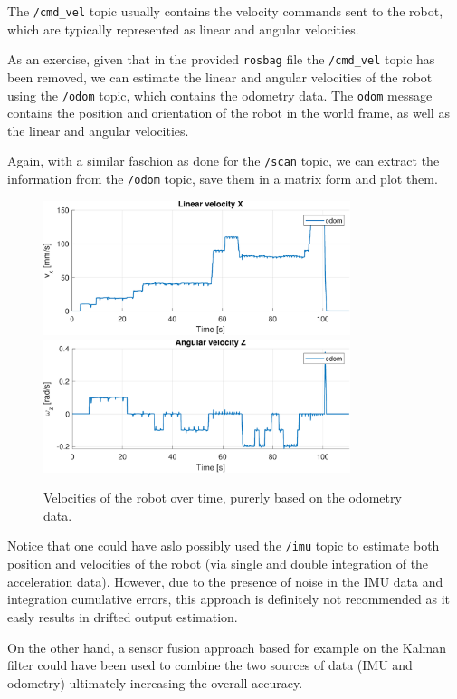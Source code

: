 The \texttt{/cmd\_vel} topic usually contains the velocity commands sent to the robot, which are typically represented as linear and angular velocities.

As an exercise, given that in the provided \texttt{rosbag} file the \texttt{/cmd\_vel} topic has been removed, we can estimate the linear and angular velocities of the robot using the \texttt{/odom} topic, which contains the odometry data.
The \texttt{odom} message contains the position and orientation of the robot in the world frame, as well as the linear and angular velocities.

Again, with a similar faschion as done for the \texttt{/scan} topic, we can extract the information from the \texttt{/odom} topic, save them in a matrix form and plot them.

\begin{figure}[H]
    \centering
    \includegraphics[width=0.8\textwidth]{./img/MATLAB/linear_velocity.pdf}
    \vspace{9pt}
    \includegraphics[width=0.8\textwidth]{./img/MATLAB/angular_velocity.pdf}
    \caption{Velocities of the robot over time, purerly based on the odometry data.}
    \label{fig:odom_velocities}
\end{figure}

Notice that one could have aslo possibly used the \texttt{/imu} topic to estimate both position and velocities of the robot (via single and double integration of the acceleration data).
However, due to the presence of noise in the IMU data and integration cumulative errors, this approach is definitely not recommended as it easly results in drifted output estimation.

On the other hand, a sensor fusion approach based for example on the Kalman filter could have been used to combine the two sources of data (IMU and odometry) ultimately increasing the overall accuracy.

